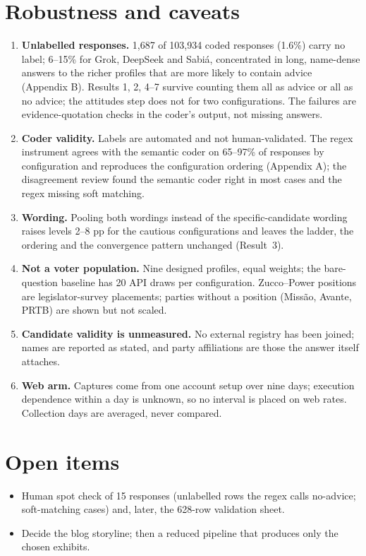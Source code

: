\documentclass[11pt]{article}
\begin{document}
\section{Robustness and caveats}

\begin{enumerate}
\item \textbf{Unlabelled responses.} 1,687 of 103,934 coded responses (1.6\%) carry no label; 6--15\% for Grok, DeepSeek and Sabiá, concentrated in long, name-dense answers to the richer profiles that are more likely to contain advice (Appendix B). Results 1, 2, 4--7 survive counting them all as advice or all as no advice; the attitudes step does not for two configurations. The failures are evidence-quotation checks in the coder's output, not missing answers.
\item \textbf{Coder validity.} Labels are automated and not human-validated. The regex instrument agrees with the semantic coder on 65--97\% of responses by configuration and reproduces the configuration ordering (Appendix A); the disagreement review found the semantic coder right in most cases and the regex missing soft matching.
\item \textbf{Wording.} Pooling both wordings instead of the specific-candidate wording raises levels 2--8 pp for the cautious configurations and leaves the ladder, the ordering and the convergence pattern unchanged (Result~3).
\item \textbf{Not a voter population.} Nine designed profiles, equal weights; the bare-question baseline has 20 API draws per configuration. Zucco--Power positions are legislator-survey placements; parties without a position (Missão, Avante, PRTB) are shown but not scaled.
\item \textbf{Candidate validity is unmeasured.} No external registry has been joined; names are reported as stated, and party affiliations are those the answer itself attaches.
\item \textbf{Web arm.} Captures come from one account setup over nine days; execution dependence within a day is unknown, so no interval is placed on web rates. Collection days are averaged, never compared.
\end{enumerate}

\section{Open items}

\begin{itemize}
\item Human spot check of 15 responses (unlabelled rows the regex calls no-advice; soft-matching cases) and, later, the 628-row validation sheet.
\item Decide the blog storyline; then a reduced pipeline that produces only the chosen exhibits.
\end{itemize}
\end{document}
